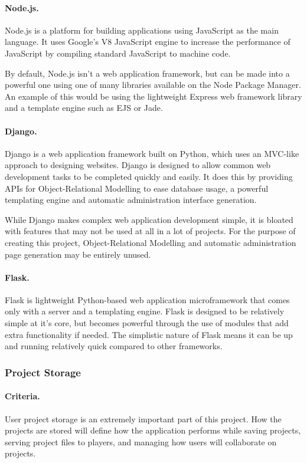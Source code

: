 \documentclass[a4paper, 12pt]{article}
\begin{document}
\paragraph{Node.js.}
Node.js is a platform for building applications using JavaScript as the main language. It uses Google's V8 JavaScript engine to increase the performance of JavaScript by compiling standard JavaScript to machine code.\cite{nodejs}

By default, Node.js isn't a web application framework, but can be made into a powerful one using one of many libraries available on the Node Package Manager.\cite{npmjs} An example of this would be using the lightweight Express web framework library and a template engine such as EJS or Jade.

\paragraph{Django.}
Django is a web application framework built on Python, which uses an MVC-like approach to designing websites.\cite{django} Django is designed to allow common web development tasks to be completed quickly and easily. It does this by providing APIs for Object-Relational Modelling to ease database usage, a powerful templating engine and automatic administration interface generation.\cite{djangooverview}

While Django makes complex web application development simple, it is bloated with features that may not be used at all in a lot of projects. For the purpose of creating this project, Object-Relational Modelling and automatic administration page generation may be entirely unused. 

\paragraph{Flask.}
Flask is lightweight Python-based web application microframework that comes only with a server and a templating engine. Flask is designed to be relatively simple at it's core, but becomes powerful through the use of modules that add extra functionality if needed.\cite{flask} The simplistic nature of Flask means it can be up and running relatively quick compared to other frameworks.

\subsubsection{Project Storage}
\paragraph{Criteria.}
User project storage is an extremely important part of this project. How the projects are stored will define how the application performs while saving projects, serving project files to players, and managing how users will collaborate on projects.
\end{document}
